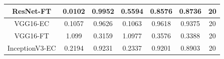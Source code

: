 \documentclass[11pt,a4paper]{article}
\theoremstyle{definition}
\begin{document}
\begin{table}[H]
\begin{tabular}{|c|c|c|c|c|c|c|}
\hline
ResNet-FT                                           & \textcolor[rgb]{0.129,0.129,0.129}{0.0102 } & \textcolor[rgb]{0.129,0.129,0.129}{0.9952 } & \textcolor[rgb]{0.129,0.129,0.129}{0.5594 }                                                                       & \textcolor[rgb]{0.129,0.129,0.129}{0.8576}                                                                             & \textcolor[rgb]{0.129,0.129,0.129}{0.8736}                                                                       & 20                                                                                                              \\
\hline
VGG16-EC                                               & \textcolor[rgb]{0.129,0.129,0.129}{0.1057 } & \textcolor[rgb]{0.129,0.129,0.129}{0.9626 } & \textcolor[rgb]{0.129,0.129,0.129}{0.1063 }                                                                       & \textcolor[rgb]{0.129,0.129,0.129}{0.9618}                                                                             & \textcolor[rgb]{0.129,0.129,0.129}{0.9375}                                                                       & 20                                                                                                              \\
\hline
VGG16-FT                                            & \textcolor[rgb]{0.129,0.129,0.129}{1.099}   & \textcolor[rgb]{0.129,0.129,0.129}{0.3159 } & \textcolor[rgb]{0.129,0.129,0.129}{1.0977 }                                                                       & \textcolor[rgb]{0.129,0.129,0.129}{0.3576}                                                                             & \textcolor[rgb]{0.129,0.129,0.129}{0.3388}                                                                       & 20                                                                                                              \\
\hline
InceptionV3-EC                                         & \textcolor[rgb]{0.129,0.129,0.129}{0.2194 } & \textcolor[rgb]{0.129,0.129,0.129}{0.9231 } & \textcolor[rgb]{0.129,0.129,0.129}{0.2337 }                                                                       & \textcolor[rgb]{0.129,0.129,0.129}{0.9201}                                                                             & \textcolor[rgb]{0.129,0.129,0.129}{0.8903}                                                                       & 20                                                                                                              \\

\end{tabular}
\end{table}
\end{document}
